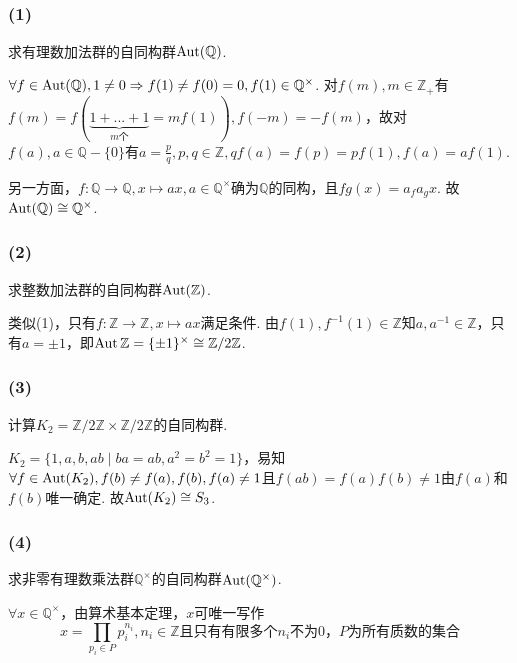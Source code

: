 
\subsection{}
\subsubsection{(1)}
求有理数加法群的自同构群$\operatorname{Aut}(\mathbb{Q})$.

\jie
$\forall f\in\operatorname{Aut}(\mathbb{Q}), 1\neq 0\Rightarrow f(1)\neq f(0)=0, f(1)\in\mathbb{Q}^{\times}$. 对$f(m), m\in\mathbb{Z}_+$有$f(m)=f(\underbrace{1+...+1}_{m\text{个}}=mf(1)), f(-m)=-f(m)$，故对$f(a), a\in\mathbb{Q}-\{0\}$有$a=\frac{p}{q}, p,q\in\mathbb{Z}, qf(a)=f(p)=pf(1), f(a)=af(1)$.

另一方面，$f: \mathbb{Q}\rightarrow\mathbb{Q}, x\mapsto ax, a\in\mathbb{Q}^{\times}$确为$\mathbb{Q}$的同构，且$fg(x)=a_fa_gx$. 故$\operatorname{Aut}(\mathbb{Q})\cong\mathbb{Q}^{\times}$.

\subsubsection{(2)}
求整数加法群的自同构群$\operatorname{Aut}(\mathbb{Z})$.

\jie
类似(1)，只有$f: \mathbb{Z}\rightarrow\mathbb{Z}, x\mapsto ax$满足条件. 由$f(1), f^{-1}(1)\in\mathbb{Z}$知$a, a^{-1}\in\mathbb{Z}$，只有$a=\pm1$，即$\operatorname{Aut}\mathbb{Z}=\{\pm1\}^{\times}\cong\mathbb{Z}/2\mathbb{Z}$.

\subsubsection{(3)}
计算$K_2=\mathbb{Z}/2\mathbb{Z}\times\mathbb{Z}/2\mathbb{Z}$的自同构群.

\jie
$K_2=\{1,a,b,ab\mid ba=ab,a^2=b^2=1\}$，易知$\forall f\in\operatorname{Aut}(K_2), f(b)\neq f(a), f(b), f(a)\neq1$且$f(ab)=f(a)f(b)\neq 1$由$f(a)$和$f(b)$唯一确定. 故$\operatorname{Aut}(K_2)\cong S_3$.

\subsubsection{(4)}
求非零有理数乘法群$\mathbb{Q}^{\times}$的自同构群$\operatorname{Aut}(\mathbb{Q}^{\times})$. 

\jie
$\forall x\in \mathbb{Q}^{\times}$，由算术基本定理，$x$可唯一写作
$$x=\prod_{p_i\in P}p_i^{n_i}, n_i\in\mathbb{Z}\text{且只有有限多个$n_i$不为0，$P$为所有质数的集合}$$

